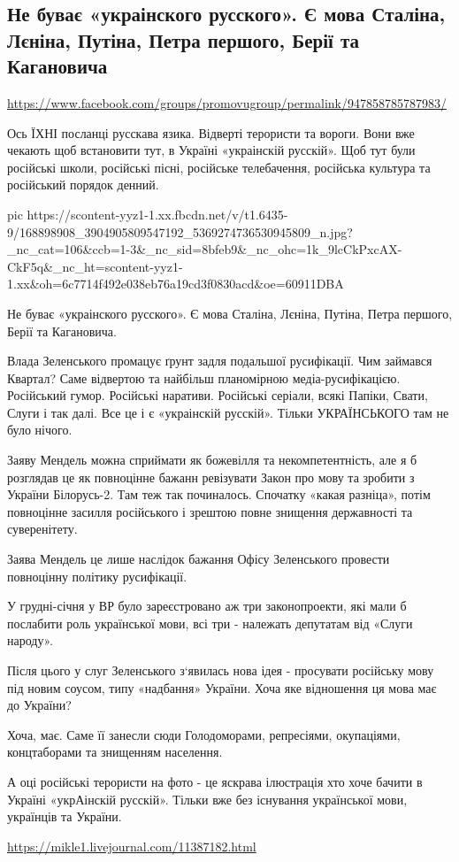  
 
 
 
 

\subsection{Не буває «украінского русского». Є мова Сталіна, Лєніна, Путіна, Петра першого, Берії та Кагановича}
\label{sec:06_04_2021.fb.smolij_andrij.1.jazyk_rusmir}
\url{https://www.facebook.com/groups/promovugroup/permalink/947858785787983/}

Ось ЇХНІ посланці русскава язика. Відверті терористи та вороги. Вони вже
чекають щоб встановити тут, в Україні  «украінскій русскій». Щоб тут були
російські школи, російські пісні, російське телебачення, російська культура та
російський порядок денний. 

\ifcmt
  pic https://scontent-yyz1-1.xx.fbcdn.net/v/t1.6435-9/168898908_3904905809547192_5369274736530945809_n.jpg?_nc_cat=106&ccb=1-3&_nc_sid=8bfeb9&_nc_ohc=1k_9lcCkPxcAX-CkF5q&_nc_ht=scontent-yyz1-1.xx&oh=6c7714f492e038eb76a19cd3f0830acd&oe=60911DBA
\fi

Не буває «украінского русского». Є мова Сталіна, Лєніна, Путіна, Петра першого, Берії та Кагановича. 

Влада Зеленського промацує ґрунт задля подальшої русифікації. Чим займався
Квартал? Саме відвертою та найбільш планомірною медіа-русифікацією. Російський
гумор. Російські наративи. Російські серіали, всякі Папіки, Свати, Слуги і так
далі. Все це і є «украінскій русскій». Тільки УКРАЇНСЬКОГО там не було нічого.

Заяву Мендель можна сприймати як божевілля та некомпетентність, але я б
розглядав це як повноцінне бажанн ревізувати Закон про мову та зробити з
України Білорусь-2. Там теж так починалось. Спочатку «какая разніца», потім
повноцінне засилля російського і зрештою повне знищення державності та
суверенітету. 

Заява Мендель це лише наслідок бажання Офісу Зеленського провести повноцінну політику русифікації.

У грудні-січня у ВР було зареєстровано аж три законопроекти, які мали б
послабити роль української мови, всі три - належать депутатам від «Слуги
народу». 

Після цього у слуг Зеленського з‘явилась нова ідея - просувати російську мову
під новим соусом, типу «надбання» України.  Хоча яке відношення ця мова має до
України? 

Хоча, має. Саме її занесли сюди Голодоморами, репресіями, окупаціями,
концтаборами та знищенням населення. 

А оці російські терористи на фото - це яскрава ілюстрація хто хоче бачити в
Україні «укрАінскій русскій». Тільки вже без існування української мови,
українців та України.

\url{https://mikle1.livejournal.com/11387182.html}
